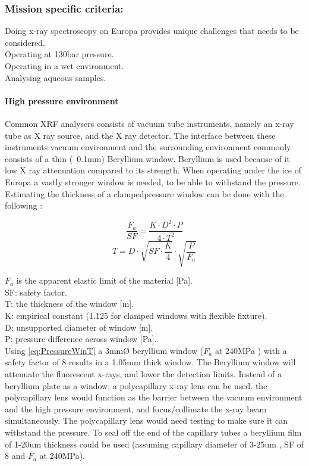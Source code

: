 \subsubsection{Mission specific criteria:}
Doing x-ray spectroscopy on Europa provides unique challenges that needs to be considered.\\
Operating at 130bar pressure.\\
Operating in a wet environment.\\
Analysing aqueous samples.\\

\paragraph{High pressure environment}
Common XRF analysers consists of vacuum tube instruments, namely an  x-ray tube as X ray source, and the X ray detector. The interface between these instruments vacuum environment and the surrounding environment commonly consists of a thin (~0.1mm) Beryllium window. Beryllium is used because of it low X ray attenuation compared to its strength. When operating under the ice of Europa a vastly stronger window is needed, to be able to withstand the pressure.
Estimating the thickness of a clampedpressure window can be done with the following \citep{High_pressure_window}: 

\begin{equation}
\frac{F_a}{SF} = \frac{K \cdot D^2 \cdot P}{4 \cdot T^2} 
\end{equation}
\begin{equation}
\label{eq:PressureWinT}
T = D \cdot \sqrt{SF \cdot \frac{K}{4}} \cdot \sqrt{\frac{P}{F_a}}
\end{equation}

\noindent$F_a$ is the apparent elastic limit of the material [Pa].\\
SF: safety factor.\\
T: the thickness of the window [m].\\
K: empirical constant (1.125 for clamped windows with flexible fixture).\\
D: unsupported diameter of window [m].\\
P: pressure difference across window [Pa].\\

Using \ref{eq:PressureWinT} a 3mmØ beryllium window ($F_a$ at 240MPa \citep{BeMechanical}) with a safety factor of 8 results in a 1.05mm thick window. The Beryllium window will attenuate the fluorescent x-rays, and lower the detection limits.
Instead of a beryllium plate as a window, a polycapillary x-ray lens can be used. the polycapillary lens would function as the barrier between the vacuum environment and the high pressure environment, and focus/collimate the x-ray beam simultaneously. The polycapillary lens would need testing to make sure it can withstand the pressure. To seal off the end of the capillary tubes a beryllium film of 1-20um thickness could be used (assuming capillary diameter of 3-25um \citep{Shaik_1995}, SF of 8 and $F_a$ at 240MPa).


